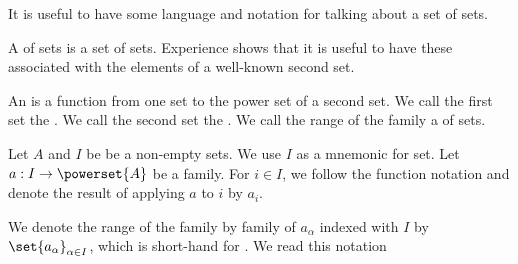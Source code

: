 
\sbasic











\sstart
{}


It is useful to
have some language and
notation for talking about
a set of sets.


A  of sets
is a set of sets.
Experience shows that it is
useful to have these associated
with the elements of a well-known
second set.

An  is a function
from one set to the power set of a second set.
We call the first set the .
We call the second set the .
We call the range of the family
a  of sets.




Let $A$ and $I$ be be a non-empty sets.
We use $I$ as a mnemonic for 
set.
Let $a: I \to \powerset{A}$ be a family.
For $i \in I$, we follow the function notation
and denote the result of applying $a$ to $i$ by
$a_{i}$.

We denote the range of the family by
family of $a_{\alpha}$ indexed with $I$
by $\set{a_{\alpha}}_{\alpha \in I}$, which is short-hand
for .
We read this notation 

\strats
